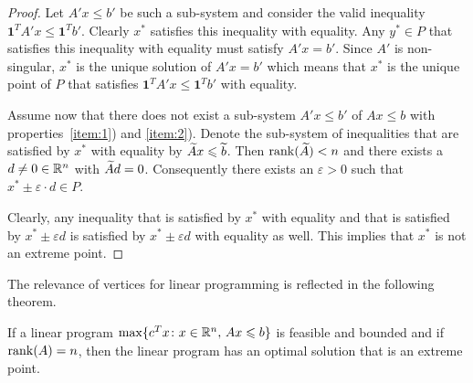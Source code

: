 \begin{proof}
  Let $A'x \leq b'$ be such a sub-system and consider the valid
  inequality $\mathbf{1}^T A' x \leq \mathbf{1}^T b'$.  Clearly $x^*$
  satisfies this inequality with equality. Any $y^* \in P$ that
  satisfies this inequality with equality must satisfy $A'x = b'$.
  Since $A'$ is non-singular, $x^*$ is the unique solution of $A'x =
  b'$ which means that $x^*$ is the unique point of $P$ that satisfies
  $\mathbf{1}^T A' x \leq \mathbf{1}^T b'$ with equality. 

  Assume now that there does not exist a sub-system $A'x \leq b'$ of
  $Ax \leq b$ with properties~\ref{item:1}) and \ref{item:2}). Denote
  the sub-system of inequalities that are satisfied by $x^*$ with
  equality by $\widetilde{A}x \leqslant \widetilde{b}$. Then $\mathrm{rank}(\widetilde{A}) < n$ and
  there exists a $d \neq 0 \in \mathbb{R}^n$ with $\widetilde{A}d = 0$. Consequently
  there exists an $\varepsilon >0$ such that $x^* \pm \varepsilon
  \cdot d \in P$.

  Clearly, any inequality that is satisfied by $x^*$ with equality and
  that is satisfied by $x^* \pm\varepsilon d$ is satisfied by $x^*
  \pm\varepsilon d$ with equality as well. This implies that $x^*$ is
  not an extreme point.
 
\end{proof}



The relevance of vertices for linear programming is reflected in the following theorem. 

\begin{theorem}
  \label{thr:2}
  If a linear program $\max\{c^Tx \colon x \in \mathbb{R}^n, \, Ax \leqslant b\}$
  is feasible and bounded and if $\mathrm{rank}(A) = n$, then the linear program has an optimal solution that is  an extreme point. 
\end{theorem}


